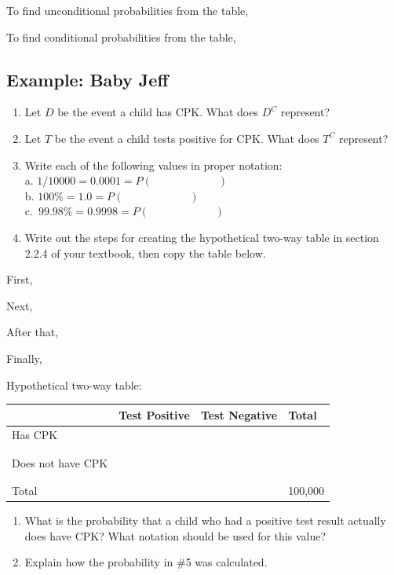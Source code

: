 \documentclass[
]{report}
\newcommand{\rgs}{\vspace{12pt}} %
\newcommand{\rgi}{\hspace{24pt}}  %
\begin{document}
\rgi \rgi To find unconditional probabilities from the table,
\rgs

\rgi \rgi To find conditional probabilities from the table,
\rgs

\hypertarget{example-baby-jeff}{%
\subsection*{Example: Baby Jeff}\label{example-baby-jeff}}

\begin{enumerate}
\def\labelenumi{\arabic{enumi}.}
\item
  Let \(D\) be the event a child has CPK. What does \(D^C\) represent?
  \rgs
\item
  Let \(T\) be the event a child tests positive for CPK. What does \(T^C\) represent?
  \rgs
\item
  Write each of the following values in proper notation:\\
  a. \(1/10000 = 0.0001 = P( \hspace{1in} )\)\\
  b. \(100\% = 1.0 = P( \hspace{1in} )\)\\
  c.~\(99.98\% = 0.9998 = P( \hspace{1in} )\)
\item
  Write out the steps for creating the hypothetical two-way table in section 2.2.4 of your textbook, then copy the table below.
\end{enumerate}

\rgi First,
\rgs

\rgi Next,
\rgs

\rgi After that,
\rgs

\rgi Finally,
\rgs

\rgi Hypothetical two-way table:

\begin{center}
\begin{tabular}{|l|p{1.3in}|p{1.3in}|p{1.3in}|}
\hline
&	Test Positive	& Test Negative	& Total \\ \hline
Has CPK		& & & \\
	& & & \\
	& & & \\ \hline
Does not have CPK		& & & \\
	& & & \\
	& & & \\ \hline		
Total & & & 100,000 \\ \hline
\end{tabular}
\end{center}
\rgs

\begin{enumerate}
\def\labelenumi{\arabic{enumi}.}
\setcounter{enumi}{4}
\item
  What is the probability that a child who had a positive test result actually does have CPK? What notation should be used for this value?
  \rgs
\item
  Explain how the probability in \#5 was calculated.
\end{enumerate}
\end{document}
